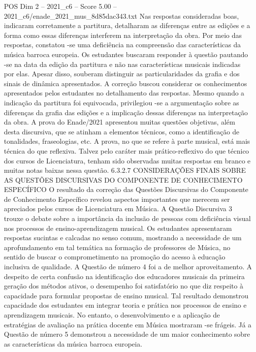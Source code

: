 \begin{textsample}{POS Dim 2 – 2021\_c6 – Score 5.00 – 2021\_c6/enade\_2021\_mus\_8d85dac343.txt}
Nas respostas consideradas boas, indicaram corretamente a partitura, detalharam as diferenças entre as edições e a forma como essas diferenças interferem na interpretação da obra.
Por meio das respostas, constatou -se uma deficiência na compreensão das características da música barroca europeia.
Os estudantes buscaram responder à questão pautando -se na data da edição da partitura e não nas características musicais indicadas por elas.
Apesar disso, souberam distinguir as particularidades da grafia e dos sinais de dinâmica apresentados.
A correção buscou considerar os conhecimentos apresentados pelos estudantes no detalhamento das respostas.
Mesmo quando a indicação da partitura foi equivocada, privilegiou -se a argumentação sobre as diferenças da grafia das edições e a implicação dessas diferenças na interpretação da obra.
A prova do Enade/2021 apresentou muitas questões objetivas, além desta discursiva, que se atinham a elementos técnicos, como a identificação de tonalidades, fraseologias, etc.
A prova, no que se refere à parte musical, está mais técnica do que reflexiva.
Talvez pelo caráter mais prático-reflexivo do que técnico dos cursos de Licenciatura, tenham sido observadas muitas respostas em branco e muitas notas baixas nessa questão. 6.3.2.7 CONSIDERAÇÕES FINAIS SOBRE AS QUESTÕES DISCURSIVAS DO COMPONENTE DE CONHECIMENTO ESPECÍFICO O resultado da correção das Questões Discursivas do Componente de Conhecimento Específico revelou aspectos importantes que merecem ser apreciados pelos cursos de Licenciatura em Música.
A Questão Discursiva 3 trouxe o debate sobre a importância da inclusão de pessoas com deficiência visual nos processos de ensino-aprendizagem musical.
Os estudantes apresentaram respostas sucintas e calcadas no senso comum, mostrando a necessidade de um aprofundamento em tal temática na formação de professores de Música, no sentido de buscar o comprometimento na promoção do acesso à educação inclusiva de qualidade.
A Questão de número 4 foi a de melhor aproveitamento.
A despeito de certa confusão na identificação dos educadores musicais da primeira geração dos métodos ativos, o desempenho foi satisfatório no que diz respeito à capacidade para formular propostas de ensino musical.
Tal resultado demonstrou capacidade dos estudantes em integrar teoria e prática nos processos de ensino e aprendizagem musicais.
No entanto, o desenvolvimento e a aplicação de estratégias de avaliação na prática docente em Música mostraram -se frágeis.
Já a Questão de número 5 demonstrou a necessidade de um maior conhecimento sobre as características da música barroca europeia.

\end{textsample}
